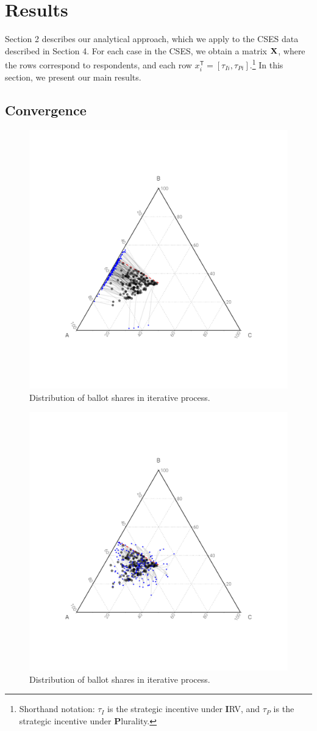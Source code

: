 \documentclass[12pt, letter]{article}
\newcommand*{\trans}{^{\mathsf{T}}} %
\begin{document}
\section{Results}

Section 2 describes our analytical approach, which we apply to the CSES data described in Section 4. For each case in the CSES, we obtain a matrix $\bf X$, where the rows correspond to respondents, and each row $x_i\trans = [\tau_{Ii}, \tau_{Pi}]$.\footnote{Shorthand notation: $\tau_{I}$ is the strategic incentive under \textbf{I}RV, and $\tau_{P}$ is the strategic incentive under \textbf{P}lurality.} In this section, we present our main results.

\subsection{Convergence}

\begin{figure}[]
	\centering
	\includegraphics[width = .4\textwidth]{../output/figures/tatonnement_plur}
	\caption{Distribution of ballot shares in iterative process.}
	\label{}
\end{figure}

\begin{figure}[]
	\centering
	\includegraphics[width = .4\textwidth]{../output/figures/tatonnement_rcv}
	\caption{Distribution of ballot shares in iterative process.}
	\label{}
\end{figure}
\end{document}
